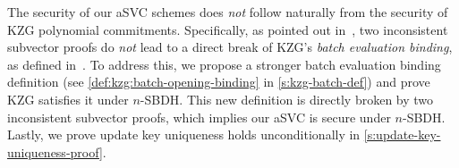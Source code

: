 The security of our aSVC schemes does \textit{not} follow naturally from the security of KZG polynomial commitments.
Specifically, as pointed out in~\cite{GRWZ20}, two inconsistent subvector proofs do \textit{not} lead to a direct break of KZG's \textit{batch evaluation binding}, as defined in~\cite[Sec. 3.4]{KZG10a}.
To address this, we propose a stronger batch evaluation binding definition (see \cref{def:kzg:batch-opening-binding} in \cref{s:kzg-batch-def}) and prove KZG satisfies it under $n$-SBDH.
This new definition is directly broken by two inconsistent subvector proofs, which implies our aSVC is secure under $n$-SBDH.
Lastly, we prove update key uniqueness holds unconditionally in \cref{s:update-key-uniqueness-proof}.

